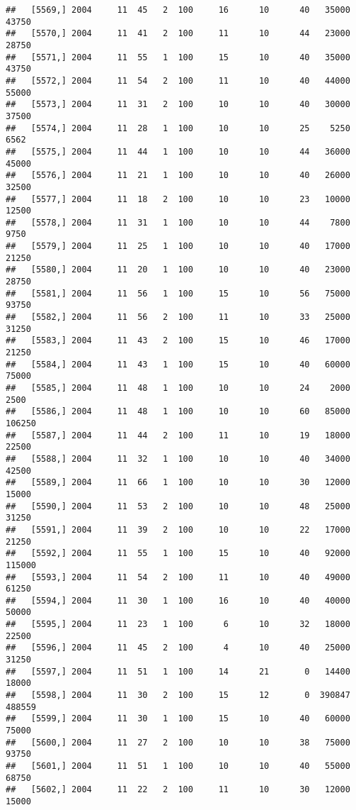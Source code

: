 \documentclass{article}\usepackage[]{graphicx}\usepackage[]{color}
\makeatletter
\newenvironment{kframe}{%
 \def\at@end@of@kframe{}%
 \ifinner\ifhmode%
  \def\at@end@of@kframe{\end{minipage}}%
  \begin{minipage}{\columnwidth}%
 \fi\fi%
 \def\FrameCommand##1{\hskip\@totalleftmargin \hskip-\fboxsep
 \colorbox{shadecolor}{##1}\hskip-\fboxsep
     \hskip-\linewidth \hskip-\@totalleftmargin \hskip\columnwidth}%
 \MakeFramed {\advance\hsize-\width
   \@totalleftmargin\z@ \linewidth\hsize
   \@setminipage}}%
 {\par\unskip\endMakeFramed%
 \at@end@of@kframe}
\newenvironment{knitrout}{}{} %
\makeatother
\begin{document}
\begin{knitrout}
\begin{kframe}
\begin{verbatim}
##   [5569,] 2004     11  45   2  100     16      10      40   35000   43750
##   [5570,] 2004     11  41   2  100     11      10      44   23000   28750
##   [5571,] 2004     11  55   1  100     15      10      40   35000   43750
##   [5572,] 2004     11  54   2  100     11      10      40   44000   55000
##   [5573,] 2004     11  31   2  100     10      10      40   30000   37500
##   [5574,] 2004     11  28   1  100     10      10      25    5250    6562
##   [5575,] 2004     11  44   1  100     10      10      44   36000   45000
##   [5576,] 2004     11  21   1  100     10      10      40   26000   32500
##   [5577,] 2004     11  18   2  100     10      10      23   10000   12500
##   [5578,] 2004     11  31   1  100     10      10      44    7800    9750
##   [5579,] 2004     11  25   1  100     10      10      40   17000   21250
##   [5580,] 2004     11  20   1  100     10      10      40   23000   28750
##   [5581,] 2004     11  56   1  100     15      10      56   75000   93750
##   [5582,] 2004     11  56   2  100     11      10      33   25000   31250
##   [5583,] 2004     11  43   2  100     15      10      46   17000   21250
##   [5584,] 2004     11  43   1  100     15      10      40   60000   75000
##   [5585,] 2004     11  48   1  100     10      10      24    2000    2500
##   [5586,] 2004     11  48   1  100     10      10      60   85000  106250
##   [5587,] 2004     11  44   2  100     11      10      19   18000   22500
##   [5588,] 2004     11  32   1  100     10      10      40   34000   42500
##   [5589,] 2004     11  66   1  100     10      10      30   12000   15000
##   [5590,] 2004     11  53   2  100     10      10      48   25000   31250
##   [5591,] 2004     11  39   2  100     10      10      22   17000   21250
##   [5592,] 2004     11  55   1  100     15      10      40   92000  115000
##   [5593,] 2004     11  54   2  100     11      10      40   49000   61250
##   [5594,] 2004     11  30   1  100     16      10      40   40000   50000
##   [5595,] 2004     11  23   1  100      6      10      32   18000   22500
##   [5596,] 2004     11  45   2  100      4      10      40   25000   31250
##   [5597,] 2004     11  51   1  100     14      21       0   14400   18000
##   [5598,] 2004     11  30   2  100     15      12       0  390847  488559
##   [5599,] 2004     11  30   1  100     15      10      40   60000   75000
##   [5600,] 2004     11  27   2  100     10      10      38   75000   93750
##   [5601,] 2004     11  51   1  100     10      10      40   55000   68750
##   [5602,] 2004     11  22   2  100     11      10      30   12000   15000

\end{verbatim}
\end{kframe}
\end{knitrout}
\end{document}
